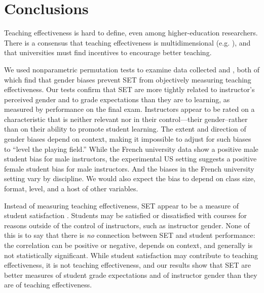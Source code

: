 \documentclass[12pt]{article}
\newcommand{\todo}[1]{{\color{red}{TO DO: \sc #1}}}
\begin{document}
\section{Conclusions}


Teaching effectiveness is hard to define, even among higher-education researchers. 
There is a consensus that teaching effectiveness is multidimensional (e.g. \citep{Marsh1997}), and that universities must find incentives to encourage better teaching. 

We used nonparametric permutation tests to examine data collected  
\citet{Boring2015} and \citet{MacNell2014}, both of which find that gender biases prevent 
SET from objectively measuring teaching effectiveness. 
Our tests confirm that SET are more tightly related to 
instructor's perceived gender and to grade expectations than they are to learning, 
as measured by performance on the final exam. 
Instructors appear to be rated on a characteristic that is neither relevant nor in their control---their
gender--rather than on their ability to promote student learning. 
The extent and direction of gender biases depend on context, making it
impossible to adjust for such biases to ``level the playing field.'' 
While the French university data show a positive male student bias for male instructors, 
the experimental US setting suggests a positive female student bias for male instructors.
And the biases in the French university setting vary by discipline.
We would also expect the bias to depend on class size, format, level, and a host of other variables.

Instead of measuring teaching effectiveness, SET appear to be a measure of student satisfaction \citep{StarkFreishtat2014}. 
Students may be satisfied or dissatisfied with courses for reasons outside of the control of instructors,
such as instructor gender. 
None of this is to say that there is \emph{no} connection between SET and student
performance: the correlation can be positive or negative, depends on context, and generally
is not statistically significant.
While student satisfaction may contribute to teaching effectiveness, it is not teaching effectiveness,
and our results show that SET are better measures of student grade expectations and of instructor 
gender than they are of teaching effectiveness.    
\end{document}
